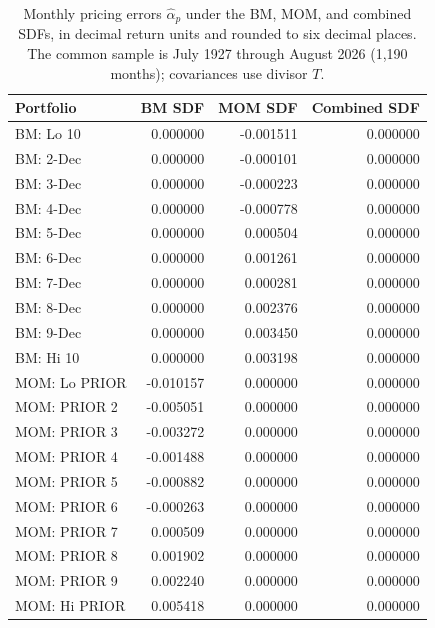 \begin{table}[!htbp]
  \centering
  \caption{Monthly pricing errors $\hat\alpha_p$ under the BM, MOM, and
  combined SDFs, in decimal return units and rounded to six decimal places.
  The common sample is July 1927 through August 2026 (1,190 months); covariances use divisor $T$.}
  \label{tab:q2d-pricing-errors}
  \small
  \begin{tabular}{lrrr}
    \toprule
    Portfolio & BM SDF & MOM SDF & Combined SDF \\
    \midrule
    BM: Lo 10 & 0.000000 & -0.001511 & 0.000000 \\
    BM: 2-Dec & 0.000000 & -0.000101 & 0.000000 \\
    BM: 3-Dec & 0.000000 & -0.000223 & 0.000000 \\
    BM: 4-Dec & 0.000000 & -0.000778 & 0.000000 \\
    BM: 5-Dec & 0.000000 & 0.000504 & 0.000000 \\
    BM: 6-Dec & 0.000000 & 0.001261 & 0.000000 \\
    BM: 7-Dec & 0.000000 & 0.000281 & 0.000000 \\
    BM: 8-Dec & 0.000000 & 0.002376 & 0.000000 \\
    BM: 9-Dec & 0.000000 & 0.003450 & 0.000000 \\
    BM: Hi 10 & 0.000000 & 0.003198 & 0.000000 \\
    \midrule
    MOM: Lo PRIOR & -0.010157 & 0.000000 & 0.000000 \\
    MOM: PRIOR 2 & -0.005051 & 0.000000 & 0.000000 \\
    MOM: PRIOR 3 & -0.003272 & 0.000000 & 0.000000 \\
    MOM: PRIOR 4 & -0.001488 & 0.000000 & 0.000000 \\
    MOM: PRIOR 5 & -0.000882 & 0.000000 & 0.000000 \\
    MOM: PRIOR 6 & -0.000263 & 0.000000 & 0.000000 \\
    MOM: PRIOR 7 & 0.000509 & 0.000000 & 0.000000 \\
    MOM: PRIOR 8 & 0.001902 & 0.000000 & 0.000000 \\
    MOM: PRIOR 9 & 0.002240 & 0.000000 & 0.000000 \\
    MOM: Hi PRIOR & 0.005418 & 0.000000 & 0.000000 \\
    \bottomrule
  \end{tabular}
\end{table}
